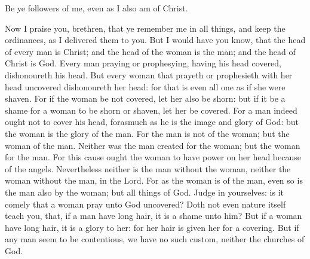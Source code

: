  Be ye followers of me, even as I also am of Christ.

 Now I praise you, brethren, that ye remember me in all
things, and keep the ordinances, as I delivered them to you.
 But I would have you know, that the head of every man is
Christ; and the head of the woman is the man; and the head of Christ is
God.  Every man praying or prophesying, having his head
covered, dishonoureth his head.  But every woman that
prayeth or prophesieth with her head uncovered dishonoureth her head:
for that is even all one as if she were shaven.  For if
the woman be not covered, let her also be shorn: but if it be a shame
for a woman to be shorn or shaven, let her be covered. 
For a man indeed ought not to cover his head, forasmuch as he is the
image and glory of God: but the woman is the glory of the man.
 For the man is not of the woman; but the woman of the
man.  Neither was the man created for the woman; but the
woman for the man.  For this cause ought the woman to
have power on her head because of the angels. 
Nevertheless neither is the man without the woman, neither the woman
without the man, in the Lord.  For as the woman is of the
man, even so is the man also by the woman; but all things of God.
 Judge in yourselves: is it comely that a woman pray unto
God uncovered?  Doth not even nature itself teach you,
that, if a man have long hair, it is a shame unto him? 
But if a woman have long hair, it is a glory to her: for her hair is
given her for a covering.  But if any man seem to be
contentious, we have no such custom, neither the churches of God.

